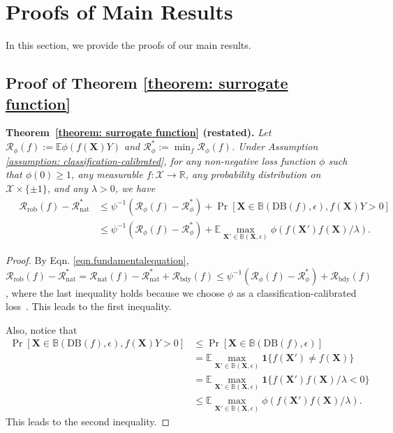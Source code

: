 \documentclass[11pt]{article}
\newcommand{\adv}{\mathrm{rob}}
\newcommand{\nat}{\mathrm{nat}}
\newcommand{\boundary}{\mathrm{DB}}
\newcommand{\R}{\mathbb{R}}
\newcommand{\X}{\bm{X}}
\newcommand{\0}{\mathbf{0}}
\newcommand{\1}{\mathbf{1}}
\newcommand{\cR}{\mathcal{R}}
\newcommand{\cX}{\mathcal{X}}
\newcommand{\bbB}{\mathbb{B}}
\newcommand{\bbE}{\mathbb{E}}
\begin{document}
\section{Proofs of Main Results}

In this section, we provide the proofs of our main results.




\subsection{Proof of Theorem \ref{theorem: surrogate function}}

\medskip
\noindent\textbf{Theorem~\ref{theorem: surrogate function} (restated).}
\emph{Let $\cR_\phi(f):=\bbE\phi(f(\X)Y)$ and $\cR_\phi^*:=\min_f \cR_\phi(f)$. Under Assumption \ref{assumption: classification-calibrated}, for any non-negative loss function $\phi$ such that $\phi(0)\ge 1$, any measurable $f:\cX\rightarrow \R$, any probability distribution on $\cX\times\{\pm 1\}$, and any $\lambda>0$, we have
\begin{equation*}
\begin{split}
\quad\cR_\adv(f)-\cR_\nat^*&\le \psi^{-1}(\cR_\phi(f)-\cR_\phi^*)+\Pr[\X\in\bbB(\boundary(f),\epsilon),f(\X)Y>0]\\
&\le \psi^{-1}(\cR_\phi(f)-\cR_\phi^*)+\bbE \max_{\X'\in\bbB(\X,\epsilon)}\phi(f(\X')f(\X)/\lambda).
\end{split}
\end{equation*}
}

\begin{proof}
By Eqn. \eqref{eqn.fundamentalequation}, $\cR_{\adv}(f)-\cR_{\nat}^*=\cR_\nat(f)-\cR_{\nat}^*+\cR_{\text{bdy}}(f)\le \psi^{-1}(\cR_\phi(f)-\cR_\phi^*)+\cR_{\text{bdy}}(f)$, where the last inequality holds because we choose $\phi$ as a classification-calibrated loss~\cite{bartlett2006convexity}. This leads to the first inequality.

Also, notice that
\begin{equation*}
\begin{split}
\Pr[\X\in\bbB(\boundary(f),\epsilon),f(\X)Y>0]&\le \Pr[\X\in\bbB(\boundary(f),\epsilon)]\\
&= \bbE \max_{\X'\in\bbB(\X,\epsilon)}\1\{f(\X')\not=f(\X)\}\\
&= \bbE \max_{\X'\in\bbB(\X,\epsilon)}\1\{f(\X')f(\X)/\lambda<0\}\\
&\le \bbE \max_{\X'\in\bbB(\X,\epsilon)}\phi(f(\X')f(\X)/\lambda).
\end{split}
\end{equation*}
This leads to the second inequality.
\end{proof}
\end{document}
